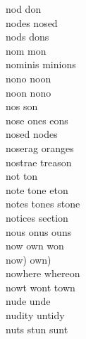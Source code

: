 nod don\\
nodes nosed\\
nods dons\\
nom mon\\
nominis minions\\
nono noon\\
noon nono\\
nos son\\
nose ones eons\\
nosed nodes\\
noserag oranges\\
nostrae treason\\
not ton\\
note tone eton\\
notes tones stone\\
notices section\\
nous onus ouns\\
now own won\\
now) own)\\
nowhere whereon\\
nowt wont town\\
nude unde\\
nudity untidy\\
nuts stun sunt\\

